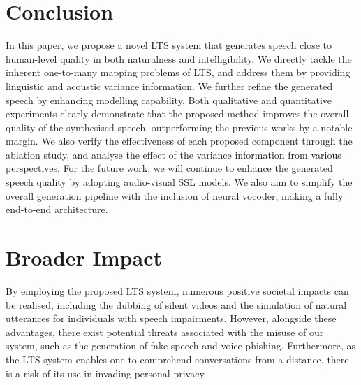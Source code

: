 \documentclass[letterpaper]{article} %
\begin{document}
\begin{table}
\centering
{}
\caption{CMOS, WER, and CER results of an ablation study.}
\label{table:ablation}
\end{table}


\section{Conclusion}

In this paper, we propose a novel LTS system that generates speech close to human-level quality in both naturalness and intelligibility.
We directly tackle the inherent one-to-many mapping problems of LTS, and address them by providing linguistic and acoustic variance information.
We further refine the generated speech by enhancing modelling capability.
Both qualitative and quantitative experiments clearly demonstrate that the proposed method improves the overall quality of the synthesised speech, outperforming the previous works by a notable margin.
We also verify the effectiveness of each proposed component through the ablation study, and analyse the effect of the variance information from various perspectives.
For the future work, we will continue to enhance the generated speech quality by adopting audio-visual SSL models.
We also aim to simplify the overall generation pipeline with the inclusion of neural vocoder, making a fully end-to-end architecture.



\section{Broader Impact}
By employing the proposed LTS system, numerous positive societal impacts can be realised, including the dubbing of silent videos and the simulation of natural utterances for individuals with speech impairments.
However, alongside these advantages, there exist potential threats associated with the misuse of our system, such as the generation of fake speech and voice phishing.
Furthermore, as the LTS system enables one to comprehend conversations from a distance, there is a risk of its use in invading personal privacy.
\end{document}
